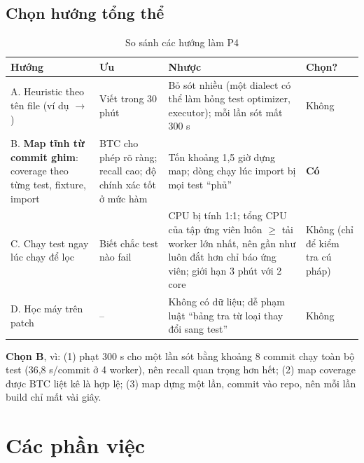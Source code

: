 \documentclass[a4paper,12pt]{article}
\newcommand{\fn}[1]{\texttt{\detokenize{#1}}}
\begin{document}
\subsection{Chọn hướng tổng thể}
\begin{table}[H]
\centering\small
\begin{tabularx}{\textwidth}{L{3.3cm}YYC{1.5cm}}
\toprule
\textbf{Hướng} & \textbf{Ưu} & \textbf{Nhược} & \textbf{Chọn?} \\
\midrule
A. Heuristic theo tên file (ví dụ \fn{dialects/x.py} $\rightarrow$ \fn{test_x.py}) & Viết trong 30 phút & Bỏ sót nhiều (một dialect có thể làm hỏng test optimizer, executor); mỗi lần sót mất 300 s & Không \\
B. \textbf{Map tĩnh từ commit ghim}: coverage theo từng test, fixture, import & BTC cho phép rõ ràng; recall cao; độ chính xác tốt ở mức hàm & Tốn khoảng 1,5 giờ dựng map; dòng chạy lúc import bị mọi test ``phủ'' & \textbf{Có} \\
C. Chạy test ngay lúc chạy để lọc & Biết chắc test nào fail & CPU bị tính 1:1; tổng CPU của tập ứng viên luôn $\ge$ tải worker lớn nhất, nên gần như luôn đắt hơn chỉ báo ứng viên; giới hạn 3 phút với 2 core & Không (chỉ để kiểm tra cú pháp) \\
D. Học máy trên patch & -- & Không có dữ liệu; dễ phạm luật ``bảng tra từ loại thay đổi sang test'' & Không \\
\bottomrule
\end{tabularx}
\caption{So sánh các hướng làm P4}
\end{table}

\textbf{Chọn B}, vì: (1) phạt 300 s cho một lần sót bằng khoảng 8 commit chạy toàn bộ test (36,8 s/commit ở 4 worker), nên recall quan trọng hơn hết; (2) map coverage được BTC liệt kê là hợp lệ; (3) map dựng một lần, commit vào repo, nên mỗi lần build chỉ mất vài giây.

\newpage
\section{Các phần việc}

\end{document}
